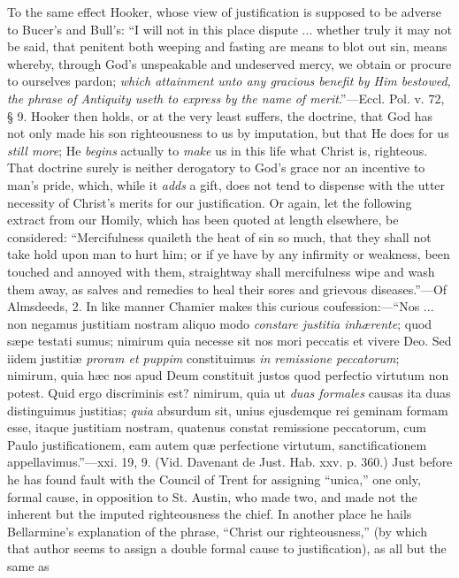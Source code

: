 To the same effect Hooker, whose view of justification is supposed
to be adverse to Bucer's and Bull's: ``I will not in this place
dispute ... whether truly it may not be said, that penitent both
weeping and fasting are means to blot out sin, means whereby, through
God's unspeakable and undeserved mercy, we obtain or procure to
ourselves pardon; \emph{which attainment unto any gracious benefit by Him
bestowed, the phrase of Antiquity useth to express by the name of
merit}.''—Eccl. Pol. v. 72, § 9. Hooker then holds, or at
the very least suffers, the doctrine, that God has not only made his
son righteousness to us by imputation, but that He does for us \emph{still
more}; He \emph{begins} actually to \emph{make} us in this life
what Christ is, righteous. That doctrine surely is neither derogatory
to God's grace nor an incentive to man's pride, which, while it \emph{adds}
a gift, does not tend to dispense with the utter necessity of Christ's
merits for our justification. Or again, let the following extract from
our Homily, which has been quoted at length elsewhere, be considered:
``Mercifulness quaileth the heat of sin so much, that they shall
not take hold upon man to hurt him; or if ye have by any infirmity or
weakness, been touched and annoyed with them, straightway shall
mercifulness wipe and wash them away, as salves and remedies to heal
their sores and grievous diseases.''—Of Almsdeeds, 2. In like
manner Chamier makes this curious coufession:—``Nos ... non
negamus justitiam nostram aliquo modo \emph{constare justitia inhærente};
quod sæpe testati sumus; nimirum quia necesse sit nos mori peccatis
et vivere Deo. Sed iidem justitiæ \emph{proram et puppim}
constituimus \emph{in remissione peccatorum}; nimirum, quia hæc nos
apud Deum constituit justos quod perfectio virtutum non potest. Quid
ergo discriminis est? nimirum, quia ut \emph{duas formales} causas ita
duas distinguimus justitias; \emph{quia} absurdum sit, unius
ejusdemque rei geminam formam esse, itaque justitiam nostram, quatenus
constat remissione peccatorum, cum Paulo justificationem, eam
autem quæ perfectione virtutum, sanctificationem appellavimus.''—xxi.
19, 9. (Vid. Davenant de Just. Hab. xxv. p. 360.) Just before he has
found fault with the Council of Trent for assigning ``unica,''
one only, formal cause, in opposition to St. Austin, who made two, and
made not the inherent but the imputed righteousness the chief. In
another place he hails Bellarmine's explanation of the phrase,
``Christ our righteousness,'' (by which that author seems to
assign a double formal cause to justification), as all but the same as

